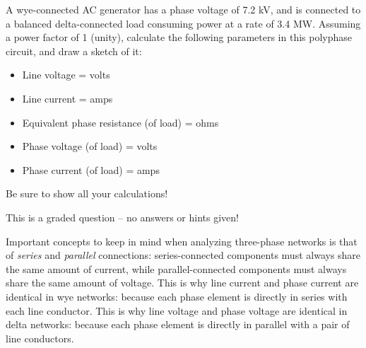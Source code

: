 

A wye-connected AC generator has a phase voltage of 7.2 kV, and is connected to a balanced delta-connected load consuming power at a rate of 3.4 MW.  Assuming a power factor of 1 (unity), calculate the following parameters in this polyphase circuit, and draw a sketch of it:

\begin{itemize}
\item{} Line voltage = \underbar{\hskip 50pt} volts
\vskip 5pt
\item{} Line current = \underbar{\hskip 50pt} amps
\vskip 5pt
\item{} Equivalent phase resistance (of load) = \underbar{\hskip 30pt} ohms
\vskip 5pt
\item{} Phase voltage (of load) = \underbar{\hskip 50pt} volts
\vskip 5pt
\item{} Phase current (of load) = \underbar{\hskip 50pt} amps
\vskip 5pt
\end{itemize}

\noindent
Be sure to show all your calculations!

\vfil

\eject






This is a graded question -- no answers or hints given!







Important concepts to keep in mind when analyzing three-phase networks is that of {\it series} and {\it parallel} connections: series-connected components must always share the same amount of current, while parallel-connected components must always share the same amount of voltage.  This is why line current and phase current are identical in wye networks: because each phase element is directly in series with each line conductor.  This is why line voltage and phase voltage are identical in delta networks: because each phase element is directly in parallel with a pair of line conductors.

\vskip 10pt

